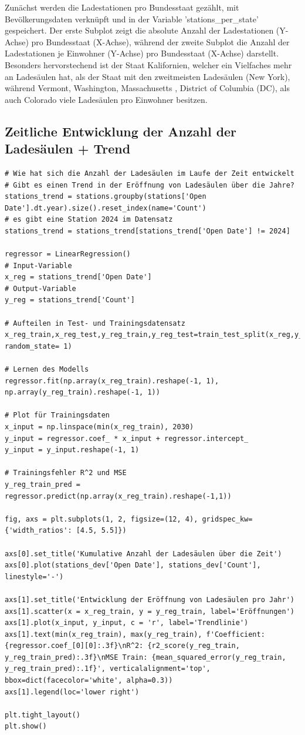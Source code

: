 Zunächst werden die Ladestationen pro Bundesstaat gezählt, mit Bevölkerungsdaten verknüpft und in der Variable 'stations\_per\_state' gespeichert. Der erste Subplot zeigt die absolute Anzahl der Ladestationen (Y-Achse) pro Bundesstaat (X-Achse), während der zweite Subplot die Anzahl der Ladestationen je Einwohner (Y-Achse) pro Bundesstaat (X-Achse) darstellt. Besonders hervorstechend ist der Staat Kalifornien, welcher ein Vielfaches mehr an Ladesäulen hat, als der Staat mit den zweitmeisten Ladesäulen (New York), während Vermont, Washington, Massachusetts , District of Columbia (DC), als auch Colorado viele Ladesäulen pro Einwohner besitzen.

\subsection{Zeitliche Entwicklung der Anzahl der Ladesäulen + Trend}

\begin{verbatim}
# Wie hat sich die Anzahl der Ladesäulen im Laufe der Zeit entwickelt
# Gibt es einen Trend in der Eröffnung von Ladesäulen über die Jahre?
stations_trend = stations.groupby(stations['Open Date'].dt.year).size().reset_index(name='Count')
# es gibt eine Station 2024 im Datensatz
stations_trend = stations_trend[stations_trend['Open Date'] != 2024]

regressor = LinearRegression()
# Input-Variable
x_reg = stations_trend['Open Date']
# Output-Variable
y_reg = stations_trend['Count']

# Aufteilen in Test- und Trainingsdatensatz 
x_reg_train,x_reg_test,y_reg_train,y_reg_test=train_test_split(x_reg,y_reg,test_size=0.3, random_state= 1)

# Lernen des Modells
regressor.fit(np.array(x_reg_train).reshape(-1, 1), np.array(y_reg_train).reshape(-1, 1))

# Plot für Trainingsdaten
x_input = np.linspace(min(x_reg_train), 2030)
y_input = regressor.coef_ * x_input + regressor.intercept_
y_input = y_input.reshape(-1, 1)

# Trainingsfehler R^2 und MSE
y_reg_train_pred = regressor.predict(np.array(x_reg_train).reshape(-1,1))

fig, axs = plt.subplots(1, 2, figsize=(12, 4), gridspec_kw={'width_ratios': [4.5, 5.5]})

axs[0].set_title('Kumulative Anzahl der Ladesäulen über die Zeit')
axs[0].plot(stations_dev['Open Date'], stations_dev['Count'], linestyle='-')

axs[1].set_title('Entwicklung der Eröffnung von Ladesäulen pro Jahr')
axs[1].scatter(x = x_reg_train, y = y_reg_train, label='Eröffnungen')
axs[1].plot(x_input, y_input, c = 'r', label='Trendlinie')
axs[1].text(min(x_reg_train), max(y_reg_train), f'Coefficient: {regressor.coef_[0][0]:.3f}\nR^2: {r2_score(y_reg_train, y_reg_train_pred):.3f}\nMSE Train: {mean_squared_error(y_reg_train, y_reg_train_pred):.1f}', verticalalignment='top', bbox=dict(facecolor='white', alpha=0.3))
axs[1].legend(loc='lower right')

plt.tight_layout()
plt.show()
\end{verbatim}

